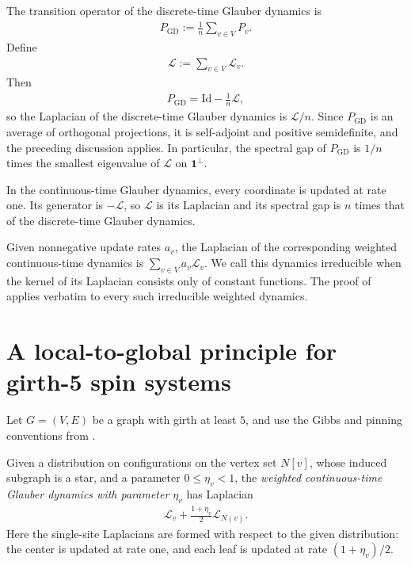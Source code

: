 \documentclass[a4paper,12pt]{article}
\theoremstyle{plain}
\theoremstyle{definition}
\def\*#1{\mathbf{#1}} %
\def\+#1{\mathcal{#1}} %
\def\*#1{\boldsymbol{#1}} %
\def\+#1{\mathcal{#1}} %
\begin{document}
The transition operator of the discrete-time Glauber dynamics is
\begin{align*}
  P_{\mathrm{GD}}:=\frac1n\sum_{v\in V}P_v.
\end{align*}
Define
\begin{align} \label{def-L}
  \+L:=\sum_{v\in V}\+L_v.
\end{align}
Then
\begin{align*}
  P_{\mathrm{GD}}=\mathrm{Id}-\frac1n\+L,
\end{align*}
so the Laplacian of the discrete-time Glauber dynamics is $\+L/n$.
Since $P_{\mathrm{GD}}$ is an average of orthogonal projections, it is
self-adjoint and positive semidefinite, and the preceding discussion
applies.  In particular, the spectral gap of $P_{\mathrm{GD}}$ is
$1/n$ times the smallest eigenvalue of $\+L$ on $\*1^\perp$.

In the continuous-time Glauber dynamics, every coordinate is updated at
rate one.  Its generator is $-\+L$, so $\+L$ is its Laplacian and its
spectral gap is $n$ times that of the discrete-time Glauber dynamics.

Given nonnegative update rates $a_v$, the Laplacian of the corresponding
weighted continuous-time dynamics is $\sum_{v\in V}a_v\+L_v$.  We call
this dynamics irreducible when the kernel of its Laplacian consists only
of constant functions.  The proof of 
applies verbatim to every such irreducible weighted dynamics.
\section{A local-to-global principle for girth-5 spin systems} \label{sec:local-to-global}
Let $G=(V,E)$ be a graph with girth at least $5$, and use the Gibbs and
pinning conventions from .

\begin{definition}
Given a distribution on configurations on the vertex set $N[v]$, whose
induced subgraph is a star, and a parameter $0\leq\eta_v<1$, the
\emph{weighted continuous-time Glauber
dynamics with parameter $\eta_v$} has Laplacian
\begin{align*}
  \+L_v+\frac{1+\eta_v}{2}\+L_{N(v)}.
\end{align*}
Here the single-site Laplacians are formed with respect to the given
distribution: the center is updated at rate one, and each leaf is updated
at rate $(1+\eta_v)/2$.
\end{definition}
\end{document}
